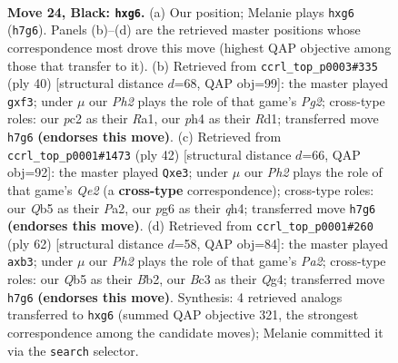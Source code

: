 \documentclass[11pt]{article}
\begin{document}
\clearpage

\begin{figure}[p]\centering
\begin{subfigure}{0.46\textwidth}\centering
\resizebox{\linewidth}{!}{%
\newchessgame
\chessboard[
  setfen={r1r3k1/p4p1p/4p1P1/pq1p4/3P1QPP/2b5/2P5/3K2RR b - - 0 24},
  showmover=false,
  pgfstyle=straightmove, color=movearrow, markmove={h7-g6}
]}
\caption{}
\end{subfigure}\hfill
\begin{subfigure}{0.46\textwidth}\centering
\resizebox{\linewidth}{!}{%
\newchessgame
\chessboard[
  setfen={3r1rk1/2p3pp/p7/3qPp2/Pp1P4/4Qp2/1P4PP/R2R2K1 w - - 0 21},
  showmover=false,
  pgfstyle=straightmove, color=movearrow, markmove={g2-f3}
]}
\caption{}
\end{subfigure}
\\[4pt]
\begin{subfigure}{0.46\textwidth}\centering
\resizebox{\linewidth}{!}{%
\newchessgame
\chessboard[
  setfen={2r2rk1/1p3ppp/8/p7/7q/1P2p2P/P3QPP1/R4RK1 w - - 0 22},
  showmover=false,
  pgfstyle=straightmove, color=movearrow, markmove={e2-e3}
]}
\caption{}
\end{subfigure}\hfill
\begin{subfigure}{0.46\textwidth}\centering
\resizebox{\linewidth}{!}{%
\newchessgame
\chessboard[
  setfen={r3r1k1/6p1/p2q4/4p2P/1p2P1Q1/1pP3P1/PB1P4/1K1R4 w - - 0 32},
  showmover=false,
  pgfstyle=straightmove, color=movearrow, markmove={a2-b3}
]}
\caption{}
\end{subfigure}
\caption{\textbf{Move 24, Black: \texttt{hxg6}.} (a) Our position; Melanie plays \texttt{hxg6} (\texttt{h7g6}). Panels (b)--(d) are the retrieved master positions whose correspondence most drove this move (highest QAP objective among those that transfer to it). (b) Retrieved from \texttt{ccrl\_top\_p0003\#335} (ply 40) [structural distance $d$=68, QAP obj=99]: the master played \texttt{gxf3}; under $\mu$ our \emph{Ph2} plays the role of that game's \emph{Pg2}; cross-type roles: our \emph{p}c2 as their \emph{R}a1, our \emph{p}h4 as their \emph{R}d1; transferred move \texttt{h7g6} \textbf{(endorses this move)}. (c) Retrieved from \texttt{ccrl\_top\_p0001\#1473} (ply 42) [structural distance $d$=66, QAP obj=92]: the master played \texttt{Qxe3}; under $\mu$ our \emph{Ph2} plays the role of that game's \emph{Qe2} (a \textbf{cross-type} correspondence); cross-type roles: our \emph{Q}b5 as their \emph{P}a2, our \emph{p}g6 as their \emph{q}h4; transferred move \texttt{h7g6} \textbf{(endorses this move)}. (d) Retrieved from \texttt{ccrl\_top\_p0001\#260} (ply 62) [structural distance $d$=58, QAP obj=84]: the master played \texttt{axb3}; under $\mu$ our \emph{Ph2} plays the role of that game's \emph{Pa2}; cross-type roles: our \emph{Q}b5 as their \emph{B}b2, our \emph{B}c3 as their \emph{Q}g4; transferred move \texttt{h7g6} \textbf{(endorses this move)}. Synthesis: 4 retrieved analogs transferred to \texttt{hxg6} (summed QAP objective 321, the strongest correspondence among the candidate moves); Melanie committed it via the \texttt{search} selector.}
\label{fig:thought-m47}
\end{figure}
\end{document}

